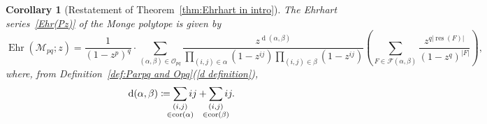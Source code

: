 \documentclass[noamsfonts,10pt]{amsart}
\newcommand{\M}{\mathcal{M}}
\newcommand{\al}{\alpha}
\newcommand{\be}{\beta}
\renewcommand{\O}{\mathcal{O}}
\newcommand{\F}{\mathcal{F}}
\renewcommand{\d}{\operatorname{d}}
\DeclareMathOperator{\Ehr}{Ehr}
\newcommand{\res}{\operatorname{res}}
\DeclareMathOperator{\cor}{cor}
\newcommand{\1}{\mathbf{1}}
\theoremstyle{plain}
\newtheorem{corollary}[theorem]{Corollary}
\theoremstyle{definition}
\numberwithin{equation}{section}
\begin{document}
\begin{corollary}[Restatement of Theorem~\ref{thm:Ehrhart in intro}]
    \label{cor:Ehrhart series}
    The Ehrhart series~\eqref{Ehr(Pz)} of the Monge polytope is given by
    \[
        \Ehr(\M_{pq}; z) = 
        \frac{1}{(1-z^p)^q} \cdot 
        \sum_{(\al, \be) \in \O_{pq}} \frac{z^{\d(\al, \be)} }{\prod_{(i,j) \in \al} (1-z^{ij}) \prod_{(i,j) \in \be} (1-z^{ij})} 
        \left( 
        \sum_{F \in \F(\al,\be)} \frac{z^{q \left| \res(F) \right|} }{ (1-z^q)^{|F|}} \right),
    \]
    where, from Definition~\ref{def:Parpq and Opq}(\ref{d definition}),
    \[
        \d(\al, \be)
        \coloneqq \sum_{\mathclap{\substack{(i,j) \\ \in \cor(\al)}}} ij + \sum_{\mathclap{\substack{(i,j) \\ \in \cor(\be)}}} ij.
    \]
\end{corollary}
\end{document}
